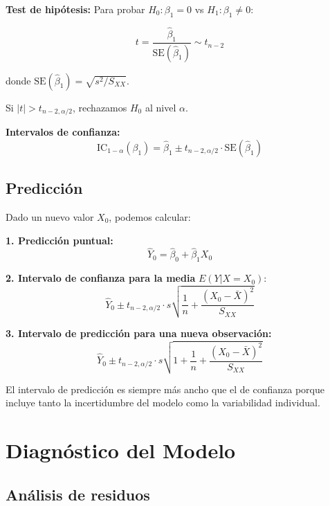 \documentclass[11pt,a4paper]{article}
\begin{document}
\textbf{Test de hipótesis:} Para probar $H_0: \beta_1 = 0$ vs $H_1: \beta_1 \neq 0$:

\begin{equation}
t = \frac{\hat{\beta}_1}{\text{SE}(\hat{\beta}_1)} \sim t_{n-2}
\end{equation}

donde $\text{SE}(\hat{\beta}_1) = \sqrt{s^2 / S_{XX}}$.

Si $|t| > t_{n-2, \alpha/2}$, rechazamos $H_0$ al nivel $\alpha$.

\textbf{Intervalos de confianza:}
\begin{equation}
\text{IC}_{1-\alpha}(\beta_1) = \hat{\beta}_1 \pm t_{n-2, \alpha/2} \cdot \text{SE}(\hat{\beta}_1)
\end{equation}

\subsection{Predicción}

Dado un nuevo valor $X_0$, podemos calcular:

\textbf{1. Predicción puntual:}
\begin{equation}
\hat{Y}_0 = \hat{\beta}_0 + \hat{\beta}_1 X_0
\end{equation}

\textbf{2. Intervalo de confianza para la media} $E(Y | X = X_0)$:
\begin{equation}
\hat{Y}_0 \pm t_{n-2, \alpha/2} \cdot s \sqrt{\frac{1}{n} + \frac{(X_0 - \bar{X})^2}{S_{XX}}}
\end{equation}

\textbf{3. Intervalo de predicción para una nueva observación:}
\begin{equation}
\hat{Y}_0 \pm t_{n-2, \alpha/2} \cdot s \sqrt{1 + \frac{1}{n} + \frac{(X_0 - \bar{X})^2}{S_{XX}}}
\end{equation}

El intervalo de predicción es siempre más ancho que el de confianza porque incluye tanto la incertidumbre del modelo como la variabilidad individual.

\section{Diagnóstico del Modelo}

\subsection{Análisis de residuos}
\end{document}
